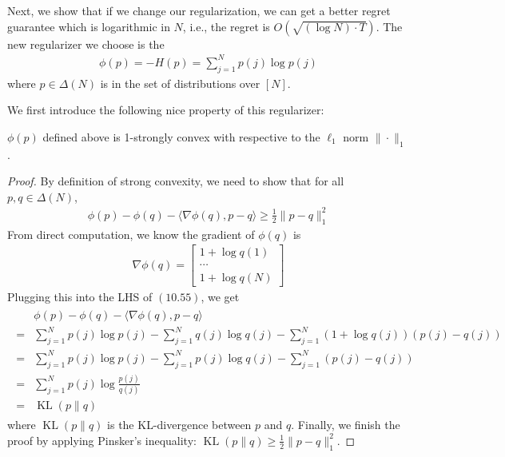 \documentclass{article}
\begin{document}
Next, we show that if we change our regularization, we can get a better regret guarantee which is logarithmic in $N$, i.e., the regret is $O(\sqrt{(\log N) \cdot T})$. The new regularizer we choose is the 
\begin{align}
\phi(p)=-H(p)=\sum_{j=1}^{N} p(j) \log p(j)\label{eq:bnmeeeez}
\end{align}
where $p \in \Delta(N)$ is in the set of distributions over $[N]$.


We first introduce the following nice property of this regularizer:
\begin{lema}
  $\phi(p)$ defined above is 1-strongly convex with respective to the $\ell_{1}$ norm $\|\cdot\|_{1}$.
\end{lema} 
\begin{proof}\color{ForestGreen}
  By definition of strong convexity, we need to show that for all $p, q \in \Delta(N)$,
\begin{align*}
\phi(p)-\phi(q)-\langle\nabla \phi(q), p-q\rangle \geq \frac{1}{2}\|p-q\|_{1}^{2}
\end{align*}
From direct computation, we know the gradient of $\phi(q)$ is
\begin{align*}
\nabla \phi(q)=\left[\begin{array}{c}
1+\log q(1) \\
\cdots \\
1+\log q(N)
\end{array}\right]
\end{align*}
Plugging this into the LHS of $(10.55)$, we get
\begin{align*}
\begin{aligned}
& \phi(p)-\phi(q)-\langle\nabla \phi(q), p-q\rangle \\
=& \sum_{j=1}^{N} p(j) \log p(j)-\sum_{j=1}^{N} q(j) \log q(j)-\sum_{j=1}^{N}(1+\log q(j))(p(j)-q(j)) \\
=& \sum_{j=1}^{N} p(j) \log p(j)-\sum_{j=1}^{N} p(j) \log q(j)-\sum_{j=1}^{N}(p(j)-q(j)) \\
=& \sum_{j=1}^{N} p(j) \log \frac{p(j)}{q(j)} \\
=& \operatorname{KL}(p \| q)
\end{aligned}
\end{align*}
where $\operatorname{KL}(p \| q)$ is the KL-divergence between $p$ and $q .$ Finally, we finish the proof by applying Pinsker's inequality: $\operatorname{KL}(p \| q) \geq \frac{1}{2}\|p-q\|_{1}^{2}$.
\end{proof}
\end{document}

